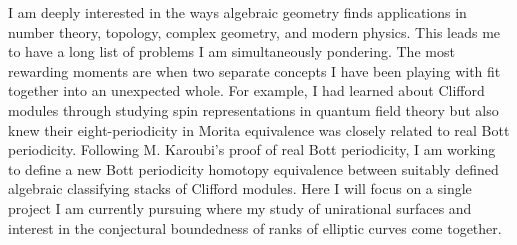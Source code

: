 \documentclass[11pt]{article}
\begin{document}
\pagestyle{empty}
\fontsize{11.1}{12.1}\selectfont %
\noindent
I am deeply interested in the ways algebraic geometry finds applications in number theory, topology, complex geometry, and modern physics. This leads me to have a long list of problems I am simultaneously pondering. The most rewarding moments are when two separate concepts I have been playing with fit together into an unexpected whole. For example, I had learned about Clifford modules through studying spin representations in quantum field theory but also knew their eight-periodicity in Morita equivalence was closely related to real Bott periodicity. Following M. Karoubi's proof of real Bott periodicity, I am working to define a new Bott periodicity homotopy equivalence between suitably defined algebraic classifying stacks of Clifford modules. Here I will focus on a single project I am currently pursuing where my study of unirational surfaces and interest in the conjectural boundedness of ranks of elliptic curves come together. 
\end{document}
